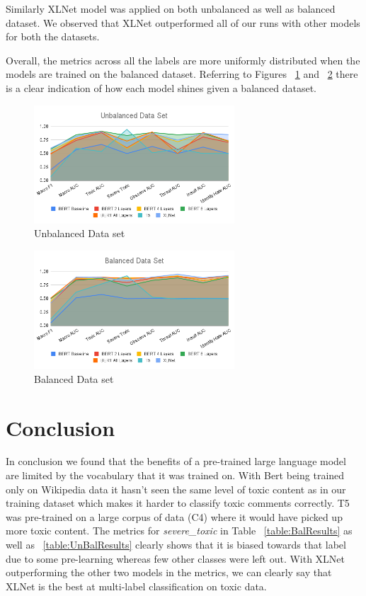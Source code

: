 \documentclass[11pt,a4paper]{article}
\begin{document}
Similarly XLNet model was applied on both unbalanced as well as balanced dataset. We observed that XLNet outperformed all of our runs with other models for both the datasets. 

Overall, the metrics across all the labels are more uniformly distributed when the models are trained on the balanced dataset. Referring to Figures ~\ref{UnbalancedData} and ~\ref{BalancedData} there is a clear indication of how each model shines given a balanced dataset.

\begin{figure}[]
\centering
\includegraphics[width=75mm,scale=0.5]{Unbalanced Data Set.png}
\caption{Unbalanced Data set}
\label{UnbalancedData}
\end{figure}

\begin{figure}[]
\centering
\includegraphics[width=75mm,scale=0.5]{Balanced Data Set.png}
\caption{Balanced Data set}
\label{BalancedData}
\end{figure}
\FloatBarrier

\section{Conclusion}
In conclusion we found that the benefits of a pre-trained large language model are limited by the vocabulary that it was trained on. With Bert being trained only on Wikipedia data it hasn't seen the same level of toxic content as in our training dataset which makes it harder to classify toxic comments correctly.
T5 was pre-trained on a large corpus of data (C4) where it would have picked up more toxic content. The metrics for \emph{severe\_toxic} in Table ~\ref{table:BalResults} as well as ~\ref{table:UnBalResults} clearly shows that it is biased towards that label due to some pre-learning whereas few other classes were left out.
With XLNet outperforming the other two models in the metrics, we can clearly say that XLNet is the best at multi-label classification on toxic data.
\end{document}
